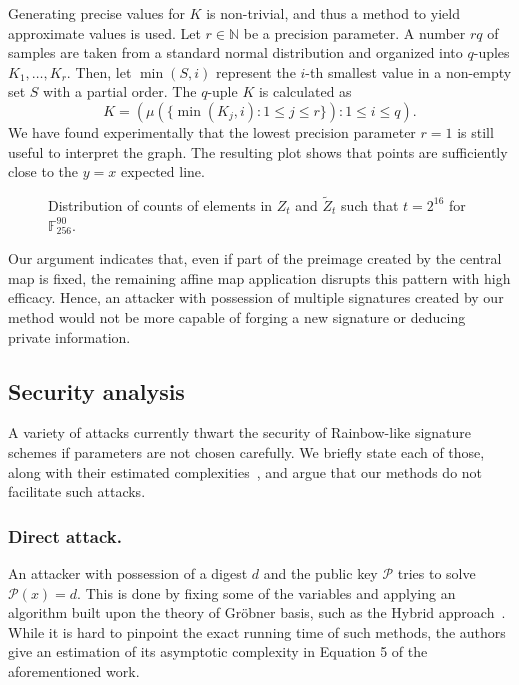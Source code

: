 \documentclass[draft, 12pt, a4paper, oneside]{memoir}
\theoremstyle{definition}
\theoremstyle{remark}
\begin{document}
Generating precise values for $K$ is non-trivial, and thus a method to yield approximate values is used. Let $r \in \mathbb{N}$ be a precision parameter. A number $rq$ of samples are taken from a standard normal distribution and organized into $q$-uples $K_{1}, \dots, K_{r}$. Then, let $\min(S, i)$ represent the $i$-th smallest value in a non-empty set $S$ with a partial order. The $q$-uple $K$ is calculated as 
\[
    K = (\mu(\{\min(K_{j}, i) : 1 \leq j \leq r\}) : 1 \leq i \leq q).
\]
We have found experimentally that the lowest precision parameter $r = 1$ is still useful to interpret the graph. The resulting plot shows that points are sufficiently close to the $y = x$ expected line.

\begin{figure}[htbp]
  \caption{Distribution of counts of elements in $Z_{t}$ and
    $\widetilde{Z}_{t}$ such that $t = 2^{16}$ for
    $\mathbb{F}_{256}^{90}$.}\label{fig:3}
\end{figure}

Our argument indicates that, even if part of the preimage created by the
central map is fixed, the remaining affine map application disrupts this
pattern with high efficacy. Hence, an attacker with possession of multiple
signatures created by our method would not be more capable of forging a new
signature or deducing private information.

\subsection{Security analysis}\label{subsec:analysis}

A variety of attacks currently thwart the security of Rainbow-like signature
schemes if parameters are not chosen carefully. We briefly state each of
those, along with their estimated complexities~\cite{Petzoldt:201005},
and argue that our methods do not facilitate such attacks.

\subsubsection{Direct attack.} An attacker with possession of a digest $d$ and
the public key $\mathcal{P}$ tries to solve $\mathcal{P}(x) = d$. This is done
by fixing some of the variables and applying an algorithm built upon the theory
of Gröbner basis, such as the Hybrid approach~\cite{Bettale:201207:inproc}.
While it is hard to pinpoint the exact running time of such methods, the
authors give an estimation of its asymptotic complexity in Equation 5 of the
aforementioned work.
\end{document}
